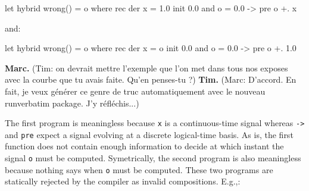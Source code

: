 \documentclass[11pt,titlepage,twoside]{report}
\newcommand{\Marc}[1]{{\bf Marc.} ({#1})}
\newcommand{\Tim}[1]{{\bf Tim.} ({#1})}
\begin{document}
\begin{runverbatim}[fail]
let hybrid wrong() = o where
  rec der x = 1.0 init 0.0
  and o = 0.0 -> pre o +. x
\end{runverbatim}
and:
\begin{runverbatim}[fail]
let hybrid wrong() = o where
  rec der x = o init 0.0
  and o = 0.0 -> pre o +. 1.0
\end{runverbatim}

\Marc{Tim: on devrait mettre l'exemple que l'on met dans tous nos exposes
avec la courbe que tu avais faite. Qu'en penses-tu ?}
\Tim{Marc: D'accord. En fait, je veux générer ce genre de truc 
automatiquement avec le nouveau runverbatim package. J'y réfléchis...}

The first program is meaningless because \texttt{x} is a
continuous-time signal whereas \texttt{->} and \texttt{pre} expect a
signal evolving at a discrete logical-time basis. As is, the first
function does not contain enough information to decide at which instant
the signal \texttt{o} must be computed. Symetrically, the second
program is also meaningless because nothing says when \texttt{o} must
be computed. These two programs are statically rejected by the compiler
as invalid compositions. E.g.,:
\runverbatimerr{}
\end{document}
